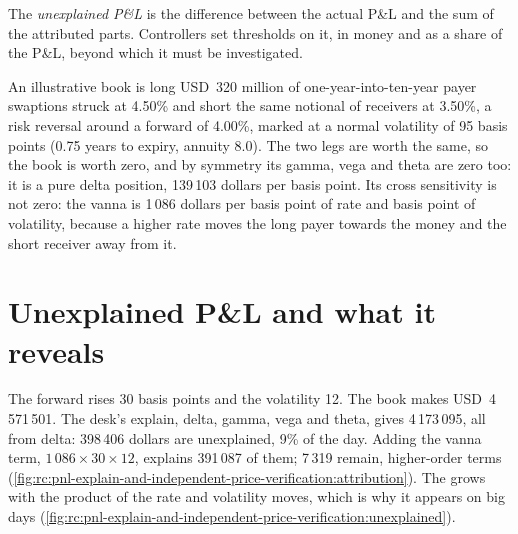 \begin{definition}[Unexplained P\&L]\label{def:rc:pnl-explain-and-independent-price-verification:unexplained}
The \emph{unexplained P\&L} is the difference between the actual P\&L and
the sum of the attributed parts. Controllers set thresholds on it, in money and as a share of the
P\&L, beyond which it must be investigated.
\end{definition}

\begin{example}\label{ex:rc:pnl-explain-and-independent-price-verification:book}
An illustrative book is long USD~320 million of one-year-into-ten-year payer swaptions struck at 4.50\%
and short the same notional of receivers at 3.50\%, a risk reversal around a forward of 4.00\%, marked at
a normal volatility of 95 basis points (0.75 years to expiry, annuity 8.0). The two legs are worth the
same, so the book is worth zero, and by symmetry its gamma, vega and theta are zero too: it is a pure
delta position, 139\,103 dollars per basis point. Its cross sensitivity is not zero: the vanna is 1\,086
dollars per basis point of rate and basis point of volatility, because a higher rate moves the long payer
towards the money and the short receiver away from it.
\end{example}

\label{lst:rc:pnl-explain-and-independent-price-verification:risk}

\section{Unexplained P\&L and what it reveals}

\begin{example}\label{ex:rc:pnl-explain-and-independent-price-verification:day}
The forward rises 30 basis points and the volatility 12. The book makes USD~4\,571\,501. The desk's
explain, delta, gamma, vega and theta, gives 4\,173\,095, all from delta: 398\,406 dollars are unexplained,
9\% of the day. Adding the vanna term, $1\,086\times30\times12$, explains 391\,087 of them; 7\,319 remain,
higher-order terms (\cref{fig:rc:pnl-explain-and-independent-price-verification:attribution}). The
 grows with the product of the rate and volatility moves, which is why it appears on big days
(\cref{fig:rc:pnl-explain-and-independent-price-verification:unexplained}).
\end{example}

